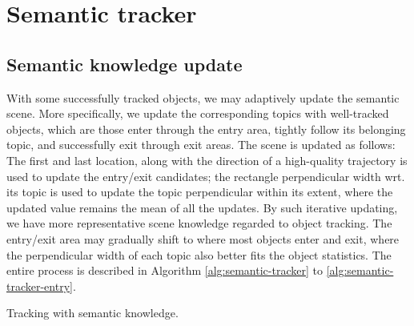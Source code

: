 \section{Semantic tracker}

\subsection{Semantic knowledge update}
With some successfully tracked objects, we may adaptively update the semantic scene. 
More specifically, we update the corresponding topics with well-tracked objects, which are those enter through the entry area, tightly follow its belonging topic, and successfully exit through exit areas. 
The scene is updated as follows: 
The first and last location, along with the direction of a high-quality trajectory is used to update the entry/exit candidates; the rectangle perpendicular width wrt. its topic is used to update the topic perpendicular within its extent, where the updated value remains the mean of all the updates.
By such iterative updating, we have more representative scene knowledge regarded to object tracking. The entry/exit area may gradually shift to where most objects enter and exit, where the perpendicular width of each topic also better fits the object statistics. The entire process is described in Algorithm \ref{alg:semantic-tracker} to \ref{alg:semantic-tracker-entry}.

\begin{algorithm}
 \caption{Tracking with semantic knowledge.}
 \label{alg:semantic-tracker}
\end{algorithm}

